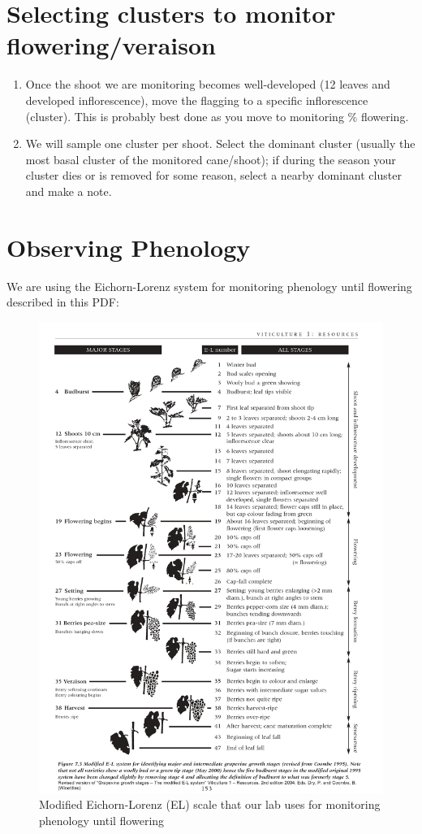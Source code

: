 \documentclass[11pt,letter]{article}
\begin{document}
\section{Selecting clusters to monitor flowering/veraison} %
\begin{enumerate}
	\item Once the shoot we are monitoring becomes well-developed (12 leaves and developed inflorescence), move the flagging to a specific inflorescence (cluster). This is probably best done as you move to monitoring \% flowering. 
	\item We will sample one cluster per shoot. Select the dominant cluster (usually the most basal cluster of the monitored cane/shoot); if during the season your cluster dies or is removed for some reason, select a nearby dominant cluster and make a note. 

\end{enumerate}

\section{Observing Phenology}
We are using the Eichorn-Lorenz system for monitoring phenology until flowering described in this PDF: \\

\begin{figure}%
  \includegraphics[width=\linewidth]{ELScale.jpg}
  \caption{ Modified Eichorn-Lorenz (EL) scale that our lab uses for monitoring phenology until flowering }
  \label{fig:ELScale}
\end{figure}
\end{document}
